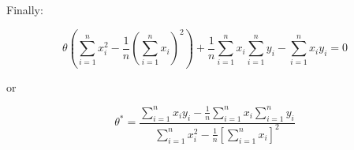\documentclass[usenames,dvipsnames]{beamer}
\begin{document}
\begin{frame}
    Finally:

    \begin{equation}
        \theta (\sum_{i=1}^{n} x_i^2 - \frac{1}{n}(\sum_{i=1}^{n} x_i)^2) +\frac{1}{n}\sum_{i=1}^{n} x_i\sum_{i=1}^{n} y_i - \sum_{i=1}^{n} x_i y_i = 0
    \end{equation}

    or

    \begin{equation}
        \theta^* = \frac{\sum_{i=1}^{n} x_i y_i - \frac{1}{n}\sum_{i=1}^{n} x_i\sum_{i=1}^{n} y_i}{\sum_{i=1}^{n} x_i^2 - \frac{1}{n}[\sum_{i=1}^{n} x_i]^2}
    \end{equation}
\end{frame}
\end{document}
